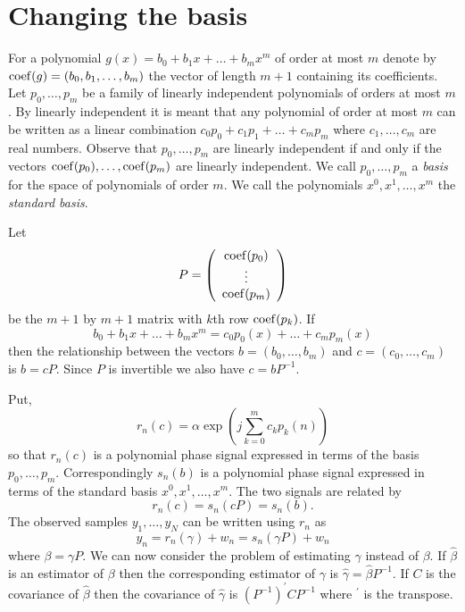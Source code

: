 \documentclass[journal,10pt]{IEEEtran}
\begin{document}
\section{Changing the basis}\label{sec:changing-basis}

\newcommand{\calP}{{\mathcal P}}

For a polynomial $g(x) = b_0 + b_1 x + \dots + b_m x^m$ of order at most $m$ denote by $\operatorname{coef}(g) = (b_0, b_1, \dots, b_m)$ the vector of length $m+1$ containing its coefficients.  Let $p_0,\dots, p_m$ be a family of linearly independent polynomials of orders at most $m$.  By linearly independent it is meant that any polynomial of order at most $m$ can be written as a linear combination $c_0p_0 + c_1 p_1 + \dots + c_m p_m$ where $c_1, \dots, c_m$ are real numbers.  Observe that $p_0, \dots, p_m$ are linearly independent if and only if the vectors $\operatorname{coef}(p_0), \dots, \operatorname{coef}(p_m)$ are linearly independent.  We call $p_0, \dots, p_m$ a \emph{basis} for the space of polynomials of order $m$.  We call the polynomials $x^0, x^1, \dots, x^m$ the \emph{standard basis}.  

Let 
\[
P = \left( \begin{array}{c}
\operatorname{coef}(p_0) \\
\vdots \\
\operatorname{coef}(p_m)
\end{array} \right)
\] 
be the $m+1$ by $m+1$ matrix with $k$th row $\operatorname{coef}(p_k)$.  If
\[
b_0 + b_1 x + \dots + b_m x^m = c_0 p_0(x) + \dots + c_m p_m(x)
\]
then the relationship between the vectors $b =  (b_0, \dots, b_m)$ and $c =  (c_0, \dots, c_m)$ is $b = cP$.  Since $P$ is invertible we also have $c = bP^{-1}$.

Put,
\[
r_n(c) = \alpha \exp\left( j \sum_{k = 0}^{m}{c_k p_k(n)}\right)
\]
so that $r_n(c)$ is a polynomial phase signal expressed in terms of the basis $p_0, \dots, p_m$.  Correspondingly $s_n(b)$ is a polynomial phase signal expressed in terms of the standard basis $x^0, x^1, \dots, x^m$.  The two signals are related by
\[
r_n(c) = s_n(cP) = s_n(b).
\]
The observed samples $y_1,\dots,y_N$ can be written using $r_n$ as
\[
y_n = r_n(\gamma) + w_n = s_n(\gamma P) + w_n
\]
where $\beta = \gamma P$.  We can now consider the problem of estimating $\gamma$ instead of $\beta$.  If $\hat{\beta}$ is an estimator of $\beta$ then the corresponding estimator of $\gamma$ is $\hat{\gamma} = \hat{\beta}P^{-1}$.  If $C$ is the covariance of $\hat{\beta}$ then the covariance of $\hat{\gamma}$ is $(P^{-1})^\prime C P^{-1}$ where $^\prime$ is the transpose.
\end{document}
